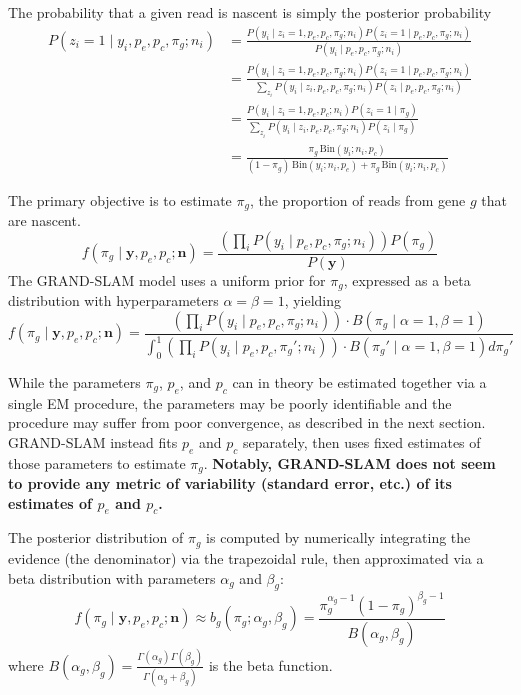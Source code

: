 \documentclass[11pt]{article}
\begin{document}
The probability that a given read is nascent is simply the posterior probability
$$
\begin{aligned}
P(z_i = 1 \mid y_i, p_e, p_c, \pi_g; n_i)
&= \frac{P(y_i \mid z_i = 1, p_e, p_c, \pi_g; n_i) P(z_i = 1 \mid p_e, p_c, \pi_g; n_i)}{P(y_i \mid p_e, p_c, \pi_g; n_i)} \\
&= \frac{P(y_i \mid z_i = 1, p_e, p_c, \pi_g; n_i) P(z_i = 1 \mid p_e, p_c, \pi_g; n_i)}{\sum_{z_i} P(y_i \mid z_i, p_e, p_c, \pi_g; n_i) P(z_i \mid p_e, p_c, \pi_g; n_i)} \\
&= \frac{P(y_i \mid z_i = 1, p_e, p_c; n_i) P(z_i = 1 \mid \pi_g)}{\sum_{z_i} P(y_i \mid z_i, p_e, p_c, \pi_g; n_i) P(z_i \mid \pi_g)} \\
&= \frac{\pi_g\,\mathrm{Bin}(y_i; n_i, p_c)}{(1 - \pi_g)\,\mathrm{Bin}(y_i;n_i,p_e)
+ \pi_g\,\mathrm{Bin}(y_i;n_i,p_c)}
\end{aligned}
$$

The primary objective is to estimate $\pi_g$, the proportion of reads from gene $g$ that are nascent.
$$
f(\pi_g \mid \mathbf{y}, p_e, p_c; \mathbf{n})
= \frac{\left(\prod_i P(y_i \mid p_e, p_c, \pi_g; n_i)\right) P(\pi_g)}{P(\mathbf{y})}
$$
The GRAND-SLAM model uses a uniform prior for $\pi_g$, expressed as a beta distribution with hyperparameters $\alpha = \beta = 1$, yielding
$$
f(\pi_g \mid \mathbf{y}, p_e, p_c; \mathbf{n})
= \frac{\left(\prod_i P(y_i \mid p_e, p_c, \pi_g; n_i)\right) \cdot B(\pi_g \mid \alpha = 1, \beta = 1)}{\int_0^1 \left(\prod_i P(y_i \mid p_e, p_c, \pi_g'; n_i)\right) \cdot B(\pi_g' \mid \alpha = 1, \beta = 1) d\pi_g'}
$$

While the parameters $\pi_g$, $p_e$, and $p_c$ can in theory be estimated together via a single EM procedure, the parameters may be poorly identifiable and the procedure may suffer from poor convergence, as described in the next section. GRAND-SLAM instead fits $p_e$ and $p_c$ separately, then uses fixed estimates of those parameters to estimate $\pi_g$. \textbf{Notably, GRAND-SLAM does not seem to provide any metric of variability (standard error, etc.) of its estimates of $p_e$ and $p_c$.}

The posterior distribution of $\pi_g$ is computed by numerically integrating the evidence (the denominator) via the trapezoidal rule, then approximated via a beta distribution with parameters $\alpha_g$ and $\beta_g$:
$$
f(\pi_g \mid \mathbf{y}, p_e, p_c; \mathbf{n})
\approx b_g(\pi_g; \alpha_g, \beta_g)
= \frac{\pi_g^{\alpha_g - 1} (1 - \pi_g)^{\beta_g - 1}}{B(\alpha_g, \beta_g)}
$$
where $B(\alpha_g, \beta_g) = \frac{\Gamma(\alpha_g) \Gamma(\beta_g)}{\Gamma(\alpha_g + \beta_g)}$ is the beta function.
\end{document}
